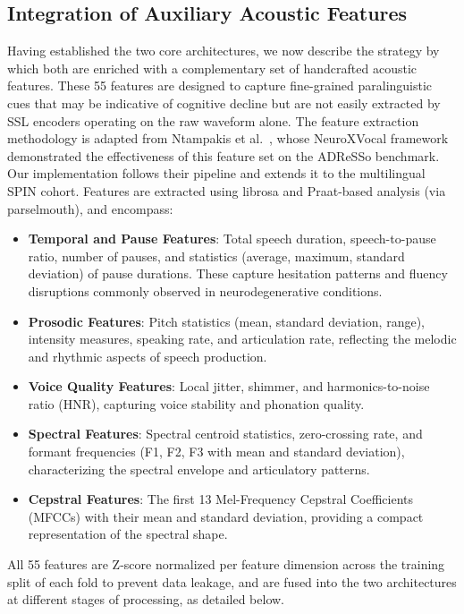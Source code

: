 \documentclass{Odyssey2026}
\begin{document}
\subsection{Integration of Auxiliary Acoustic Features}

Having established the two core architectures, we now describe the strategy by which both are enriched with a complementary set of handcrafted acoustic features. These 55 features are designed to capture fine-grained paralinguistic cues that may be indicative of cognitive decline but are not easily extracted by SSL encoders operating on the raw waveform alone. The feature extraction methodology is adapted from Ntampakis et al.\ \cite{ntampakis2025neuroxvocal}, whose NeuroXVocal framework demonstrated the effectiveness of this feature set on the ADReSSo benchmark. Our implementation follows their pipeline and extends it to the multilingual SPIN cohort. Features are extracted using librosa and Praat-based analysis (via parselmouth), and encompass:

\begin{itemize}
    \item \textbf{Temporal and Pause Features}: Total speech duration, speech-to-pause ratio, number of pauses, and statistics (average, maximum, standard deviation) of pause durations. These capture hesitation patterns and fluency disruptions commonly observed in neurodegenerative conditions.
    \item \textbf{Prosodic Features}: Pitch statistics (mean, standard deviation, range), intensity measures, speaking rate, and articulation rate, reflecting the melodic and rhythmic aspects of speech production.
    \item \textbf{Voice Quality Features}: Local jitter, shimmer, and harmonics-to-noise ratio (HNR), capturing voice stability and phonation quality.
    \item \textbf{Spectral Features}: Spectral centroid statistics, zero-crossing rate, and formant frequencies (F1, F2, F3 with mean and standard deviation), characterizing the spectral envelope and articulatory patterns.
    \item \textbf{Cepstral Features}: The first 13 Mel-Frequency Cepstral Coefficients (MFCCs) with their mean and standard deviation, providing a compact representation of the spectral shape.
\end{itemize}

All 55 features are Z-score normalized per feature dimension across the training split of each fold to prevent data leakage, and are fused into the two architectures at different stages of processing, as detailed below.
\end{document}
